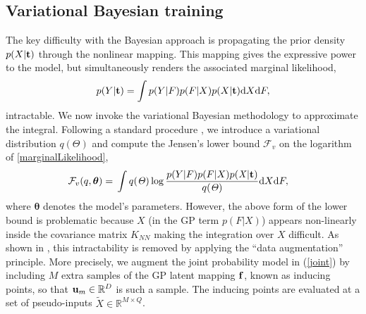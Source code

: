 \documentclass{article} %
\begin{document}
\subsection{Variational Bayesian training} 

The key difficulty with the Bayesian approach is propagating the prior
density $p(X|\mathbf{t})$ through the nonlinear mapping. This
mapping gives the expressive power to the model, but simultaneously
renders the associated marginal
likelihood,
\begin{equation}
\label{marginalLikelihood}
p(Y | \mathbf{t}) =  \int p( Y | F) p(F | X ) p(X | \mathbf{t}) \text{d}  X \text{d} F,
\end{equation}
intractable. We now invoke the variational Bayesian methodology to
approximate the integral. Following a standard procedure
\cite{bishop}, we introduce a variational distribution $q(\Theta)$ and
compute the Jensen's lower bound $\mathcal{F}_v$ on the logarithm of
\eqref{marginalLikelihood},
%
\begin{align}
\mathcal{F}_v(q, \boldsymbol \theta) = {}& \int q(\mathit{\Theta}) \log 
		\frac{ p(Y | F) p(F | X ) p(\mathit{X} | \mathbf{t})}
			 {q(\mathit{\Theta})}  \text{d}  X \text{d} F,
		 \label{jensens1}
\end{align}
%
%
where $\boldsymbol \theta$ denotes the model's parameters.  However,
the above form of the lower bound is problematic because $X$ (in the
GP term $p(F|X)$) appears non-linearly inside the covariance matrix
$K_{NN}$ making the integration over $X$ difficult. As shown in
\cite{BayesianGPLVM}, this intractability is removed by applying the
``data augmentation'' principle.  More precisely, we augment the joint
probability model in (\ref{joint}) by including $M$ extra samples of
the GP latent mapping $\mathbf{f}$, known as inducing points, so that
$\mathbf{u}_m \in \mathbb{R}^D$ is such a sample. The inducing points are
evaluated at a set of pseudo-inputs $\tilde{X} \in \mathbb{R}^{M
  \times Q}$. %
\end{document}
